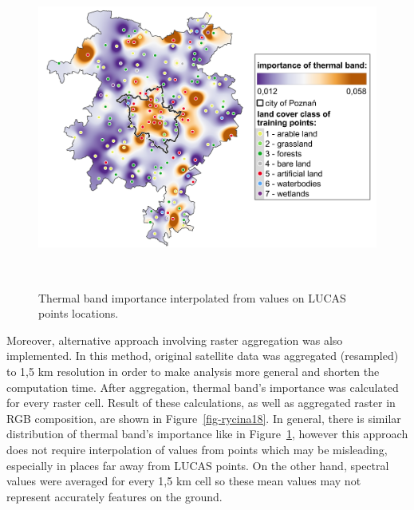 \documentclass{amuthesis}
\begin{document}
\begin{figure}[H]

{\centering \includegraphics[width=5.875in,height=4.16667in]{./figures/B10_importance-spatial-ENG.png}

}

\caption{\label{fig-rycina17}Thermal band importance interpolated from
values on LUCAS points locations.}

\end{figure}

Moreover, alternative approach involving raster aggregation was also
implemented. In this method, original satellite data was aggregated
(resampled) to 1,5 km resolution in order to make analysis more general
and shorten the computation time. After aggregation, thermal band's
importance was calculated for every raster cell. Result of these
calculations, as well as aggregated raster in RGB composition, are shown
in Figure~\ref{fig-rycina18}. In general, there is similar distribution
of thermal band's importance like in Figure~\ref{fig-rycina17}, however
this approach does not require interpolation of values from points which
may be misleading, especially in places far away from LUCAS points. On
the other hand, spectral values were averaged for every 1,5 km cell so
these mean values may not represent accurately features on the ground.
\end{document}
